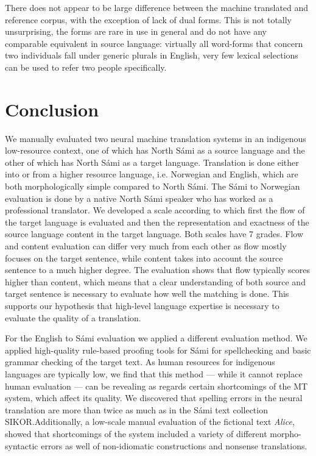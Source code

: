 \documentclass{flammie}
\begin{document}
There does not appear to be large difference between the machine translated and
reference corpus, with the exception of lack of dual forms.  This is not totally
unsurprising, the forms are rare in use in general and do not have any
comparable equivalent in source language: virtually all word-forms that concern
two individuals fall under generic plurals in English, very few lexical
selections can be used to refer two people specifically.
























\section{Conclusion}

We manually evaluated two neural machine translation systems in an indigenous
low-resource context, one of which has North Sámi as a source language and the
other of which has North Sámi as a target language.  Translation is done either
into or from a higher resource language, i.e. Norwegian and English, which are
both morphologically simple compared to North Sámi.  The Sámi to Norwegian
evaluation is done by a native North Sámi speaker who has worked as a
professional translator. We developed a scale according to which first the flow
of the target language is evaluated and then the representation and exactness of
the source language content in the target language. Both scales have 7 grades.
Flow and content evaluation can differ very much from each other as flow mostly
focuses on the target sentence, while content takes into account the source
sentence to a much higher degree. The evaluation shows that flow typically
scores higher than content, which means that a clear understanding of both
source and target sentence is necessary to evaluate how well the matching is
done. This supports our hypothesis that high-level language expertise is
necessary to evaluate the quality of a translation.

For the English to Sámi evaluation we applied a different evaluation method. We
applied high-quality rule-based proofing tools for Sámi for spellchecking and
basic grammar checking of the target text. As human resources for indigenous
languages are typically low, we find that this method --- while it cannot replace
human evaluation --- can be revealing as regards certain shortcomings of the MT
system, which affect its quality.  We discovered that spelling errors in the
neural translation are more than twice as much as in the Sámi text collection
SIKOR.\@ Additionally, a low-scale manual evaluation of the fictional text
\textit{Alice}, showed that shortcomings of the system included a variety of
different morpho-syntactic errors as well of non-idiomatic constructions and
nonsense translations.
\end{document}
